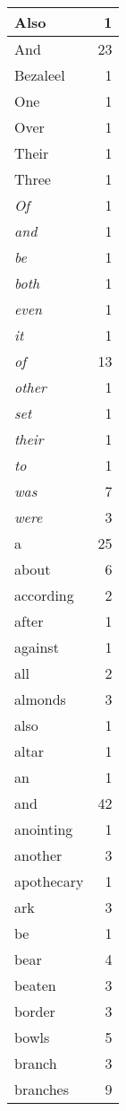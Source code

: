 \begin{center}
\begin{longtable}{l|r}
\hline \hline
\endlastfoot
Also & 1 \\ \hline
And & 23 \\ \hline
Bezaleel & 1 \\ \hline
One & 1 \\ \hline
Over & 1 \\ \hline
Their & 1 \\ \hline
Three & 1 \\ \hline
\emph{Of} & 1 \\ \hline
\emph{and} & 1 \\ \hline
\emph{be} & 1 \\ \hline
\emph{both} & 1 \\ \hline
\emph{even} & 1 \\ \hline
\emph{it} & 1 \\ \hline
\emph{of} & 13 \\ \hline
\emph{other} & 1 \\ \hline
\emph{set} & 1 \\ \hline
\emph{their} & 1 \\ \hline
\emph{to} & 1 \\ \hline
\emph{was} & 7 \\ \hline
\emph{were} & 3 \\ \hline
a & 25 \\ \hline
about & 6 \\ \hline
according & 2 \\ \hline
after & 1 \\ \hline
against & 1 \\ \hline
all & 2 \\ \hline
almonds & 3 \\ \hline
also & 1 \\ \hline
altar & 1 \\ \hline
an & 1 \\ \hline
and & 42 \\ \hline
anointing & 1 \\ \hline
another & 3 \\ \hline
apothecary & 1 \\ \hline
ark & 3 \\ \hline
be & 1 \\ \hline
bear & 4 \\ \hline
beaten & 3 \\ \hline
border & 3 \\ \hline
bowls & 5 \\ \hline
branch & 3 \\ \hline
branches & 9 \\ \hline

\end{longtable}
\end{center}
